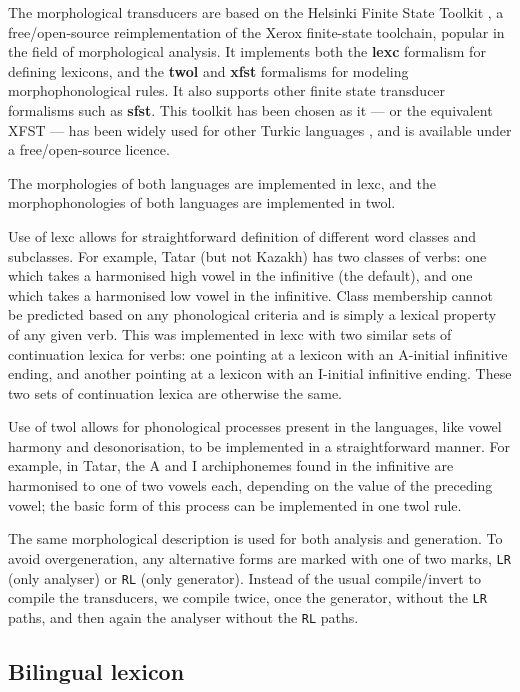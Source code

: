 \documentclass[a4paper,11pt]{article}
\begin{document}
The morphological transducers are based on the Helsinki Finite State Toolkit \citep{hfst/2011}, a free/open-source reimplementation of the Xerox finite-state toolchain, popular in the field of morphological analysis. It implements both the \textbf{lexc} formalism for defining lexicons, and the \textbf{twol} and \textbf{xfst} formalisms for modeling morphophonological rules. It also supports other finite state transducer formalisms such as \textbf{sfst}. This toolkit has been chosen as it --- or the equivalent XFST --- has been widely used for other Turkic languages \citep{coltekin2010,altintas2001,tantug2006,washingtonipasovtyers12,tyerswashingtonsalimzyanbattalov12}, and is available under a free/open-source licence.

The morphologies of both languages are implemented in lexc, and the morphophonologies of both languages are implemented in twol.

Use of lexc allows for straightforward definition of different word classes and subclasses.  For example, Tatar (but not Kazakh) has two classes of verbs: one which takes a harmonised high vowel in the infinitive (the default), and one which takes a harmonised low vowel in the infinitive.  Class membership cannot be predicted based on any phonological criteria and is simply a lexical property of any given verb.  This was implemented in lexc with two similar sets of continuation lexica for verbs: one pointing at a lexicon with an A-initial infinitive ending, and another pointing at a lexicon with an I-initial infinitive ending.  These two sets of continuation lexica are otherwise the same.

Use of twol allows for phonological processes present in the languages, like vowel harmony and desonorisation, to be implemented in a straightforward manner.  For example, in Tatar, the A and I archiphonemes found in the infinitive are harmonised to one of two vowels each, depending on the value of the preceding vowel; the basic form of this process can be implemented in one twol rule.

The same morphological description is used for both analysis and generation. To avoid overgeneration, any alternative forms are 
marked with one of two marks, {\tt {\small LR}} (only analyser) or {\tt {\small RL}} (only generator). Instead of the usual
compile/invert to compile the transducers, we compile twice, once the generator, without the {\tt {\small LR}} paths, and
then again the analyser without the {\tt {\small RL}} paths. 

\subsection{Bilingual lexicon}
\end{document}
